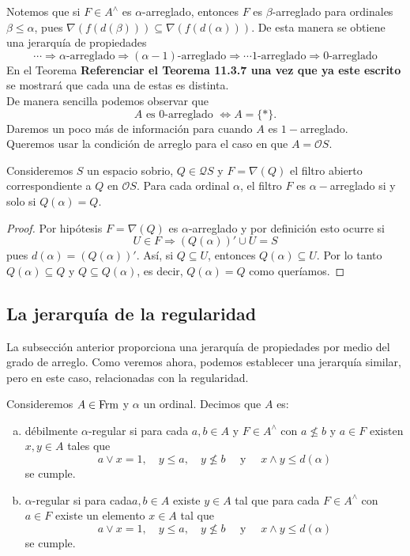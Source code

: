 Notemos que si $F\in A^\wedge$ es $\alpha$-arreglado, entonces $F$ es $\beta$-arreglado para ordinales $\beta\leq \alpha$, pues $\nabla(f(d(\beta)))\subseteq \nabla(f(d(\alpha)))$. De esta manera se obtiene una jerarquía de propiedades
\[
\cdots \Rightarrow \alpha\mbox{-arreglado}\Rightarrow (\alpha-1)\mbox{-arreglado}\Rightarrow \cdots 1\mbox{-arreglado}\Rightarrow 0\mbox{-arreglado}
\]
En el Teorema \textbf{Referenciar el Teorema 11.3.7 una vez que ya este escrito} se mostrará que cada una de estas es distinta.\\

De manera sencilla podemos observar que
\[
A \mbox{ es } 0\mbox{-arreglado }\Leftrightarrow A=\{*\}.
\]
Daremos un poco más de información para cuando $A$ es $1-$arreglado.\\

Queremos usar la condición de arreglo para el caso en que $A=\mathcal{O}S$.

\begin{lem}\label{Lema8.2.3}
    Consideremos $S$ un espacio sobrio, $Q\in \mathcal{Q}S$ y $F=\nabla(Q)$ el filtro abierto correspondiente a $Q$ en $\mathcal{O}S$. Para cada ordinal $\alpha$, el filtro $F$ es $\alpha-$arreglado si y solo si $Q(\alpha)=Q$.
\end{lem}

\begin{proof}
    Por hipótesis $F=\nabla (Q)$ es $\alpha$-arreglado y por definición esto ocurre si 
    \[
    U\in F\Rightarrow (Q(\alpha))'\cup U=S
    \]
    pues $d(\alpha)=(Q(\alpha))'$. Así, si $Q\subseteq U$, entonces $Q(\alpha)\subseteq U$. Por lo tanto $Q(\alpha)\subseteq Q$ y $Q\subseteq Q(\alpha)$, es decir, $Q(\alpha)=Q$ como queríamos.
\end{proof}

\subsection{La jerarquía de la regularidad}

La subsección anterior proporciona una jerarquía de propiedades por medio del grado de arreglo. Como veremos ahora, podemos establecer una jerarquía similar, pero en este caso, relacionadas con la regularidad.

\begin{dfn}\label{Definición8.3.1}
    Consideremos $A\in \mathrm{Frm}$ y $\alpha$ un ordinal. Decimos que $A$ es:
    \begin{enumerate}[a)]
        \item débilmente $\alpha$-regular si para cada $a, b\in A$ y $F\in A^\wedge$ con $a\nleq b$ y $a\in F$ existen $x, y\in A$ tales que 
        \[
        a\vee x=1,\quad y\leq a,\quad y\nleq b\quad \mbox{ y }\quad x\wedge y\leq d(\alpha)
        \]
        se cumple.
        \item $\alpha$-regular si para cada$a,b\in A$ existe $y\in A$ tal que para cada $F\in A^\wedge$ con $a\in F$ existe un elemento $x\in A$ tal que 
        \[
        a\vee x=1,\quad y\leq a,\quad y\nleq b\quad \mbox{ y }\quad x\wedge y\leq d(\alpha)
        \]
        se cumple.
    \end{enumerate}
\end{dfn}

